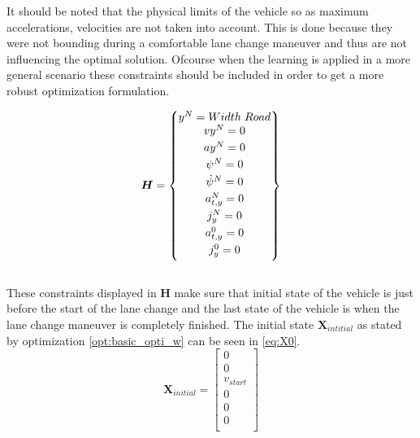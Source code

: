 It should be noted that the physical limits of the vehicle so as maximum accelerations, velocities are not taken into account. This is done because they were not bounding during a comfortable lane change maneuver and thus are not influencing the optimal solution. Ofcourse when the learning is applied in a more general scenario these constraints should be included in order to get a more robust optimization formulation.

\begin{equation}\label{eq:H}
\bm{H} =
\begin{Bmatrix}
y^N = Width\hspace{1mm}Road \\ \vspace{1mm}
vy^N = 0 \\\vspace{1mm}
ay^N = 0 \\\vspace{1mm}
\psi^N = 0 \\\vspace{1mm}
\dot{\psi}^N = 0 \\\vspace{1mm}
a_{t,y}^N = 0 \\\vspace{1mm}
j_y^N = 0 \\\vspace{1mm}
a_{t,y}^0 = 0 \\\vspace{1mm}
j_y^0 = 0 
\end{Bmatrix}
\end{equation}\\

These constraints displayed in $\bm{H}$ make sure that initial state of the vehicle is just before the start of the lane change and the last state of the vehicle is when the lane change maneuver is completely finished. The initial state $\bm{X}_{intitial}$ as stated by optimization \ref{opt:basic_opti_w} can be seen in \ref{eq:X0}.
\begin{equation}\label{eq:X0}
\bm{X}_{initial} =
\begin{bmatrix}
 0\\ 
 0\\
 v_{start}\\
 0\\
 0\\
 0\\
\end{bmatrix}
\end{equation}\\

